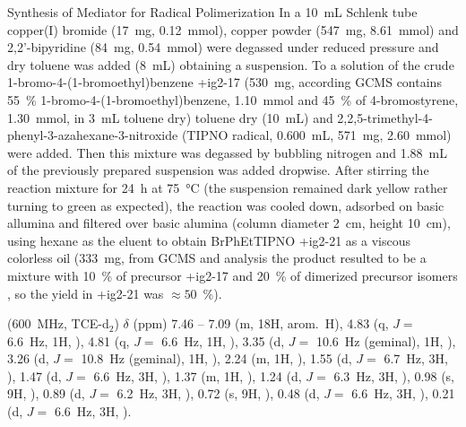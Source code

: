 \begin{section}{Synthesis of Mediator for Radical Polimerization}
In a \SI{10}{\mL} Schlenk tube copper(I) bromide (\SI{17}{\mg}, \SI{0.12}{\mmol}), copper powder (\SI{547}{\mg}, \SI{8.61}{\mmol}) and 2,2'-bi\-pyridine (\SI{84}{\mg}, \SI{0.54}{\mmol}) were degassed under reduced pressure and dry toluene was added (\SI{8}{\mL}) obtaining a suspension.
To a solution of the crude 1-bromo-4-(1-bromo\-ethyl)\-benzene \cmpd+{ig2-17} (\SI{530}{\mg}, according \gls{GCMS} contains 55~\% 1-bromo-4-(1-bromo\-ethyl)\-benzene, \SI{1.10}{\mmol} and 45~\% of 4-bromo\-styrene, \SI{1.30}{\mmol}, in \SI{3}{\mL} toluene dry) toluene dry (\SI{10}{\mL}) and 2,2,5-tri\-methyl-4-phenyl-3-aza\-hexane-3-nitr\-oxide (\gls{TIPNO} radical, \SI{0.600}{\mL}, \SI{571}{\mg}, \SI{2.60}{\mmol}) were added. 
Then this mixture was degassed by bubbling nitrogen and \SI{1.88}{\mL} of the previously prepared suspension was added dropwise. After stirring the reaction mixture for \SI{24}{\hour} at \SI{75}{\celsius} (the suspension remained dark yellow rather turning to green as expected), the reaction was cooled down, adsorbed on basic allumina and filtered over basic alumina (column diameter \SI{2}{\cm}, height \SI{10}{\cm}), using hexane as the eluent to obtain \acrfull{BrPhEtTIPNO} \cmpd+{ig2-21} as a viscous colorless oil (\SI{333}{\mg}, from \gls{GCMS} and {\HNMR} analysis the product resulted to be a mixture with 10~\% of precursor \cmpd+{ig2-17} and 20~\% of di\-merized precursor isomers , so the yield in \cmpd+{ig2-21} was $\approx 50$~\%).

{\HNMR} (\SI{600}{\MHz}, \gls{TCE}-d$_2$) $\delta$ (ppm) 7.46 – 7.09 (m, 18H, arom.\ H), 4.83 (q, $J =$ \SI{6.6}{\Hz}, 1H, ), 4.81 (q, $J =$ \SI{6.6}{\Hz}, 1H, ), 3.35 (d, $J =$ \SI{10.6}{\Hz} (geminal), 1H, ), 3.26 (d, $J =$ \SI{10.8}{\Hz} (geminal), 1H, ), 2.24 (m, 1H, ), 1.55 (d, $J =$ \SI{6.7}{\Hz}, 3H, ), 1.47 (d, $J =$ \SI{6.6}{\Hz}, 3H, ), 1.37 (m, 1H, ), 1.24 (d, $J =$ \SI{6.3}{\Hz}, 3H, ), 0.98 (s, 9H, ), 0.89 (d, $J =$ \SI{6.2}{\Hz}, 3H, ), 0.72 (s, 9H, ), 0.48 (d, $J =$ \SI{6.6}{\Hz}, 3H, ), 0.21 (d, $J =$ \SI{6.6}{\Hz}, 3H, ).

\end{section}
